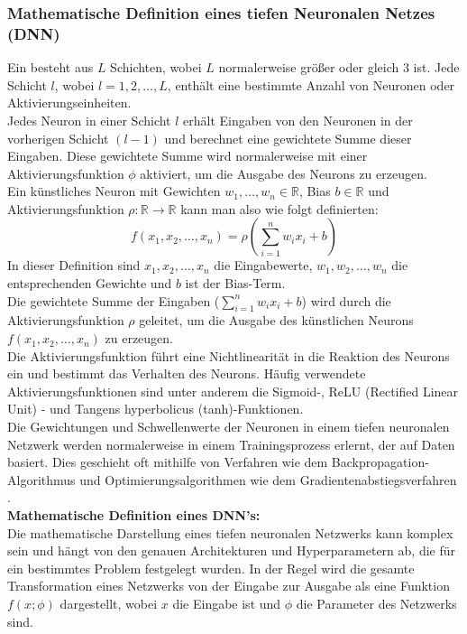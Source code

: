 \documentclass[12pt]{article}
\begin{document}
\subsubsection{Mathematische Definition eines tiefen Neuronalen Netzes (DNN)}
%
Ein {\color{blue}{tiefes neuronales Netzwerk}} besteht aus $L$ Schichten, wobei $L$ normalerweise größer oder gleich 3 ist. Jede Schicht $l$, wobei $l = 1, 2, \ldots, L$, enthält eine bestimmte Anzahl von Neuronen oder Aktivierungseinheiten.\\
%
Jedes Neuron in einer Schicht $l$ erhält Eingaben von den Neuronen in der vorherigen Schicht $(l-1)$ und berechnet eine gewichtete Summe dieser Eingaben. Diese gewichtete Summe wird normalerweise mit einer Aktivierungsfunktion $\phi$ aktiviert, um die Ausgabe des Neurons zu erzeugen.\\[0.1cm]
Ein künstliches Neuron mit Gewichten $w_1, \ldots, w_n \in \mathbb{R}$, Bias $b \in \mathbb{R}$ und Aktivierungsfunktion $\rho : \mathbb{R} \rightarrow \mathbb{R}$ kann man also wie folgt definierten:
\[
f(x_1, x_2, \ldots, x_n) = \rho\left(\sum_{i=1}^{n} w_i x_i + b\right)
\]
%
In dieser Definition sind $x_1, x_2, \ldots, x_n$ die Eingabewerte, $w_1, w_2, \ldots, w_n$ die entsprechenden Gewichte und $b$ ist der Bias-Term. \\
Die gewichtete Summe der Eingaben ($\sum_{i=1}^{n} w_i x_i + b$) wird durch die Aktivierungsfunktion $\rho$ geleitet, um die Ausgabe des künstlichen Neurons $f(x_1, x_2, \ldots, x_n)$ zu erzeugen.\\ 
Die Aktivierungsfunktion führt eine Nichtlinearität in die Reaktion des Neurons ein und bestimmt das Verhalten des Neurons. Häufig verwendete Aktivierungsfunktionen sind unter anderem die Sigmoid-, ReLU (Rectified Linear Unit)  - und Tangens hyperbolicus (tanh)-Funktionen.\\
%
Die Gewichtungen und Schwellenwerte der Neuronen in einem tiefen neuronalen Netzwerk werden normalerweise in einem Trainingsprozess erlernt, der auf Daten basiert. Dies geschieht oft mithilfe von Verfahren wie dem Backpropagation-Algorithmus und Optimierungsalgorithmen wie dem Gradientenabstiegsverfahren .\\[0.2cm]
%
\textbf{Mathematische Definition eines DNN's:}\\
Die mathematische Darstellung eines tiefen neuronalen Netzwerks kann komplex sein und hängt von den genauen Architekturen und Hyperparametern ab, die für ein bestimmtes Problem festgelegt wurden. In der Regel wird die gesamte Transformation eines Netzwerks von der Eingabe zur Ausgabe als eine Funktion $f(x; \phi)$ dargestellt, wobei $x$ die Eingabe ist und $\phi$ die Parameter des Netzwerks sind.\\[0.2cm]
\end{document}

